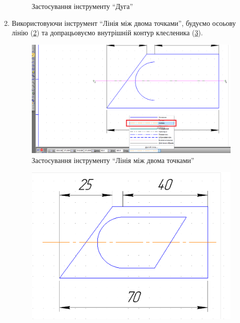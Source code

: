 \begin{enumerate}[leftmargin=*]
\begin{figure}[!ht]
    \caption{Застосування інструменту ``Дуга''}
    \label{fig:lab3:step3} 
  \end{figure}

\item Використовуючи інструмент ``Лінія між двома точками'', будуємо осоьову лінію
  (\ref{fig:lab3:central_line}) та допрацьовуємо внутрішній контур клесленика
  (\ref{fig:lab3:step6}).
  \begin{figure}[!ht]
    \centering \includegraphics[width=0.9\linewidth]{./images/lab3/step5.png}
    \caption{Застосування інструменту ``Лінія між двома точками''}
    \label{fig:lab3:central_line} 
  \end{figure}
  \begin{figure}[!ht]
    \centering \includegraphics[width=0.9\linewidth]{./images/lab3/step6.png}
    \caption{\label{fig:lab3:step6}}
  \end{figure}


\end{enumerate}
